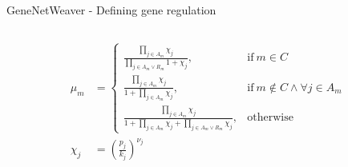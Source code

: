 \begin{frame}{GeneNetWeaver - Defining gene regulation}
\begin{columns}
\begin{column}{0.5\textwidth}
\begin{subequations}
\begin{align}
\label{eq:gnw_f.e}
\mu_m &=
\begin{cases}
  \frac{\prod_{j \in A_m} \chi_j}{\prod_{j \in A_m \vee R_m} 1 + \chi_j},
  & \text{if}\ m \in C \\
  \frac{\prod_{j \in A_m} \chi_j}{1 + \prod_{j \in A_m} \chi_j},
  & \text{if}\ m \notin C \wedge \forall j \in A_m \\
  \frac{\prod_{j \in A_m} \chi_j}{1 + \prod_{j \in A_m} \chi_j + \prod_{j \in A_m \vee R_m} \chi_j},
  & \text{otherwise}
\end{cases}
\\
\label{eq:gnw_f.f}
\chi_j &=
\left( \frac{p_j}{k_j} \right) ^ {\nu_j}
\end{align}
\end{subequations}
\end{column}
\end{columns}
\end{frame}


